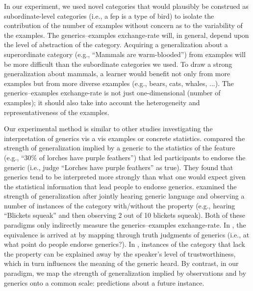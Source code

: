 \documentclass[10pt,letterpaper]{article}
\newcommand{\mht}[1]{\textcolor{Blue}{[mht: #1]}}
\begin{document}
In our experiment, we used novel categories that would plausibly be construed as subordinate-level categories (i.e., a fep is a type of bird) to isolate the contribution of the number of examples without concern as to the variability of the examples. %
The generics--examples exchange-rate will, in general, depend upon the level of abstraction of the category. 
Acquiring a generalization about a superordinate category (e.g., ``Mammals are warm-blooded'') from examples will be more difficult than the subordinate categories we used. 
To draw a strong generalization about mammals, a learner would benefit not only from more examples but from more diverse examples (e.g., bears, cats, whales, ...). %
The generics--examples exchange-rate is not just one-dimensional (number of examples); it should also take into account the heterogeneity and representativeness of the examples. 





Our experimental method is similar to other studies investigating the interpretation of generics vis a vis examples or concrete statistics.
 compared the strength of generalization implied by a generic to the statistics of the feature (e.g., ``30\% of lorches have purple feathers'') that led participants to endorse the generic (i.e., judge ``Lorches have purple feathers'' as true). 
They found that generics tend to be interpreted more strongly than what one would expect given the statistical information that lead people to endorse generics. 
 examined the strength of generalization after jointly hearing generic language and observing a number of instances of the category with/without the property (e.g., hearing ``Blickets squeak'' and then observing 2 out of 10 blickets squeak).
Both of these paradigms only indirectly measure the generics--examples exchange-rate.
In , the equivalence is arrived at by mapping through truth judgments of generics (i.e., at what point do people endorse generics?).
In , instances of the category that lack the property can  be explained away by the speaker's level of trustworthiness, which in turn influences the meaning of the generic heard.
By contrast, in our paradigm, we map the strength of generalization implied by observations and by generics onto a common scale: predictions about a future instance. 
\end{document}
